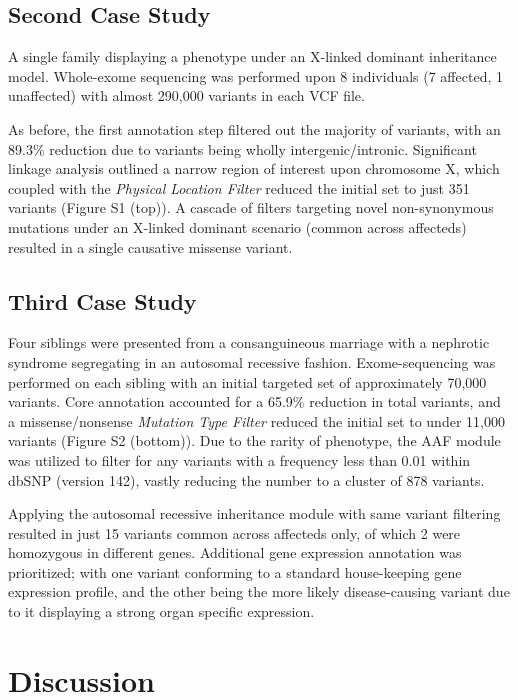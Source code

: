 \documentclass[twocolumn]{bmcart}%
\newcommand{\changes}[1]{{\color{red} #1}}
\begin{document}
\changes{
\subsection*{Second Case Study}

A  single  family  displaying  a  phenotype  under  an  X-linked dominant inheritance model. Whole-exome sequencing was performed upon 8 individuals (7 affected, 1 unaffected) with almost 290,000  variants in each VCF file. 

As before, the first annotation step filtered out the majority of variants, with an 89.3\% reduction due to variants being wholly intergenic/intronic. Significant linkage  analysis  outlined  a  narrow  region  of  interest upon chromosome X, which coupled with the \textit{Physical Location Filter} reduced the initial set to just 351 variants (Figure S1 (top)). A cascade of filters targeting novel  non-synonymous  mutations  under  an  X-linked dominant scenario (common across affecteds) resulted in a single causative missense variant.


\subsection*{Third Case Study}

Four siblings were presented from a consanguineous marriage with a nephrotic syndrome segregating in an autosomal recessive fashion. Exome-sequencing was
performed on each sibling with an initial targeted set of approximately 70,000 variants. Core annotation accounted for a 65.9\% reduction in total variants, and a missense/nonsense \textit{Mutation Type Filter} reduced the initial set to under 11,000 variants (Figure S2 (bottom)). Due to the rarity of phenotype, the AAF module was utilized to filter for any variants with a frequency less than 0.01 within dbSNP (version 142), vastly reducing the number to a cluster of 878 variants.

Applying the autosomal recessive inheritance module with same variant filtering resulted in just 15 variants common across affecteds only, of which 2 were
homozygous in different genes. Additional gene expression annotation was prioritized; with one variant conforming to a standard house-keeping gene expression
profile, and the other being the more likely disease-causing variant due to it displaying a strong organ specific expression.
}



\section*{Discussion}
\end{document}
